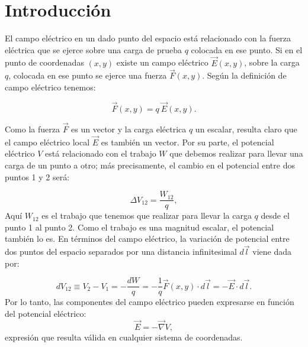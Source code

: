 \documentclass[laboratorio]{guia}
\begin{document}
 
\maketitle

\section{Introducci\'on}

El campo el\'ectrico en un dado punto del espacio est\'a relacionado con la fuerza
el\'ectrica que se ejerce sobre una carga de prueba $q$ colocada en ese punto. Si
en el punto de coordenadas $(x,y)$ existe un campo el\'ectrico $\vec{E}(x,y)$,
sobre la carga $q$, colocada en ese punto se ejerce una fuerza $\vec{F}(x,y)$.
Seg\'un la definici\'on de campo el\'ectrico tenemos:

\begin{equation} 
\vec{F}(x,y) = q \: \vec{E}(x,y).  
\end{equation}

Como la fuerza $\vec{F}$ es un vector y la carga el\'ectrica $q$ un escalar, resulta claro que el campo el\'ectrico local $\vec{E}$ es tambi\'en
un vector. Por su parte, el potencial el\'ectrico $V$ est\'a relacionado con el
trabajo $W$ que debemos realizar para llevar una carga de un punto a otro; m\'as
precisamente, el cambio en el potencial entre dos puntos 1 y 2 ser\'a: 

\begin{equation}
    \Delta V_{12} = \frac{W_{12}}{q},
\end{equation}
Aqu\'i $W_{12}$ es el trabajo que tenemos que realizar para llevar la
carga $q$ desde el punto 1 al punto 2. Como el trabajo es una magnitud escalar, el
potencial tambi\'en lo es. En t\'erminos del campo el\'ectrico, la variaci\'on de potencial entre dos puntos del espacio separados por una distancia infinitesimal $d\vec{l}$ viene dada por:

\begin{equation}
    dV_{12} \equiv V_2 - V_1 = - \frac{dW}{q} = - \frac{1}{q} \vec{F}(x,y)
    \cdot d\vec{l} = - \vec{E} \cdot d\vec{l}.
\end{equation}
Por lo tanto, las componentes del campo el\'ectrico pueden expresarse en funci\'on del potencial el\'ectrico:
\begin{equation}
    \vec{E} = - \vec{\nabla} V,
\end{equation}
expresi\'on que resulta v\'alida en cualquier sistema de coordenadas. 
\end{document}
